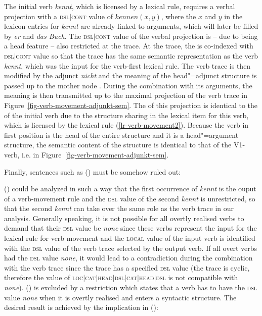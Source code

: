 The initial verb \emph{kennt}, which is licensed by a lexical rule, requires a verbal projection
with a \textsc{dsl$|$cont} value of
$kennen(x, y)$, where the $x$ and $y$ in the lexicon entries for \emph{kennt} are already linked to arguments, which will later be
filled by \emph{er} and \emph{das Buch}. The \textsc{dsl$|$cont} value of the verbal projection is -- due to \dsl being a head feature -- also
restricted at the trace. At the trace, the \contv{} is co-indexed with \textsc{dsl$|$cont} value so that the trace has the same semantic representation
as the verb \emph{kennt}, which was the input for the verb-first lexical rule. The verb trace is then modified by the adjunct \emph{nicht} 
and the meaning of the head"=adjunct structure is passed up to the mother node . During the combination with its arguments, the 
meaning is then transmitted up to the maximal projection of the verb trace in Figure~\ref{fig-verb-movement-adjunkt-sem}. The \contv of this
projection is identical to the \contv of the initial verb due to the structure sharing in the lexical item for this verb, which is licensed by the lexical 
rule (\ref{lr-verb-movement2}). Because the verb in first position is the head of the entire structure and it is a head"=argument structure, the semantic
content of the structure is identical to that of the V1-verb, i.e.  in Figure~\ref{fig-verb-movement-adjunkt-sem}.

Finally, sentences such as () must be somehow ruled out:
\z


() could be analyzed in such a way that the first occurrence of \emph{kennt} is the ouput of a verb-movement rule
and the \textsc{dsl} value of the second \emph{kennt} is unrestricted, so that the second \emph{kennt} can take over the 
same role as the verb trace in our analysis. Generally speaking, it is not possible for all overtly realised verbs to demand that
their  \textsc{dsl} value be \emph{none} since these verbs represent the input for the lexical rule for verb movement and
the \textsc{local} value of the input verb is identified with the \textsc{dsl} value of the verb trace selected by the output verb.
If all overt verbs had the \textsc{dsl} value \emph{none}, it would lead to a contradiction during the combination with the verb
trace since the trace has a specified \textsc{dsl} value (the trace is cyclic, therefore the value of \textsc{loc$|$cat$|$\-head$|$\-dsl$|$\-cat$|$\-head$|$\-dsl}
is not compatible with \emph{none}).
() is excluded by a restriction which states that a verb has to have the \textsc{dsl} value \emph{none} when it is
overtly realised and enters a syntactic structure. The desired result is achieved by the implication in ():

